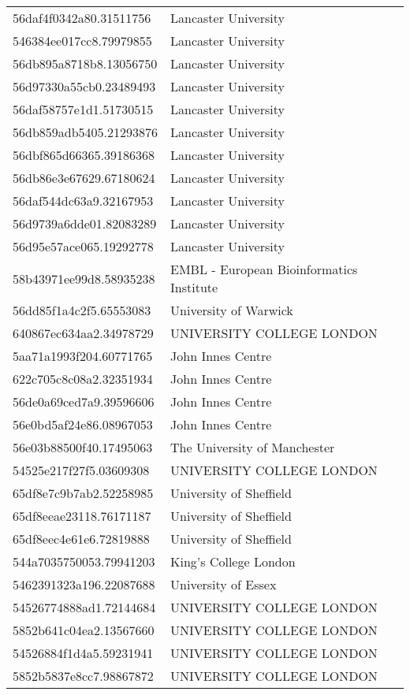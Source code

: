 \begin{tabular}{ll}
56daf4f0342a80.31511756 & Lancaster University \\
546384ee017cc8.79979855 & Lancaster University \\
56db895a8718b8.13056750 & Lancaster University \\
56d97330a55cb0.23489493 & Lancaster University \\
56daf58757e1d1.51730515 & Lancaster University \\
56db859adb5405.21293876 & Lancaster University \\
56dbf865d66365.39186368 & Lancaster University \\
56db86e3e67629.67180624 & Lancaster University \\
56daf544dc63a9.32167953 & Lancaster University \\
56d9739a6dde01.82083289 & Lancaster University \\
56d95e57ace065.19292778 & Lancaster University \\
58b43971ee99d8.58935238 & EMBL - European Bioinformatics Institute \\
56dd85f1a4c2f5.65553083 & University of Warwick \\
640867ec634aa2.34978729 & UNIVERSITY COLLEGE LONDON \\
5aa71a1993f204.60771765 & John Innes Centre \\
622c705c8c08a2.32351934 & John Innes Centre \\
56de0a69ced7a9.39596606 & John Innes Centre \\
56e0bd5af24e86.08967053 & John Innes Centre \\
56e03b88500f40.17495063 & The University of Manchester \\
54525e217f27f5.03609308 & UNIVERSITY COLLEGE LONDON \\
65df8e7c9b7ab2.52258985 & University of Sheffield \\
65df8eeae23118.76171187 & University of Sheffield \\
65df8eec4e61e6.72819888 & University of Sheffield \\
544a7035750053.79941203 & King's College London \\
5462391323a196.22087688 & University of Essex \\
54526774888ad1.72144684 & UNIVERSITY COLLEGE LONDON \\
5852b641c04ea2.13567660 & UNIVERSITY COLLEGE LONDON \\
54526884f1d4a5.59231941 & UNIVERSITY COLLEGE LONDON \\
5852b5837e8cc7.98867872 & UNIVERSITY COLLEGE LONDON \\

\end{tabular}
